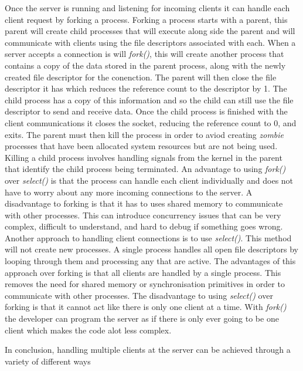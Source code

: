\documentclass[12pt,a4paper,titlepage]{article}
\begin{document}
Once the server is running and listening for incoming clients it can handle each client request by forking a process. Forking a process starts with a parent, this parent will create child processes that will execute along side the parent and will communicate with clients using the file descriptors associated with each. When a server accepts a connection is will \textit{fork()}, this will create another process that contains a copy of the data stored in the parent process, along with the newly created file descriptor for the conenction. The parent will then close the file descriptor it has which reduces the reference count to the descriptor by 1. The child process has a copy of this information and so the child can still use the file descriptor to send and receive data. Once the child process is finished with the client communications it closes the socket, reducing the reference count to 0, and exits. The parent must then kill the process in order to aviod creating \textit{zombie} processes that have been allocated system resources but are not being used. Killing a child process involves handling signals from the kernel in the parent that identify the child process being terminated. An advantage to using \textit{fork()} over \textit{select()} is that the process can handle each client individually and does not have to worry about any more incoming connections to the server. A disadvantage to forking is that it has to uses shared memory to communicate with other processes. This can introduce concurrency issues that can be very complex, difficult to understand, and hard to debug if something goes wrong.\\

Another approach to handling client connections is to use \textit{select()}. This method will not create new processes. A single process handles all open file descriptors by looping through them and processing any that are active. The advantages of this approach over forking is that all clients are handled by a single process. This removes the need for shared memory or synchronisation primitives in order to communicate with other processes.\cite{theworldofselect} The disadvantage to using \textit{select()} over forking is that it cannot act like there is only one client at a time. With \textit{fork()} the developer can program the server as if there is only ever going to be one client which makes the code alot less complex. 



In conclusion, handling multiple clients at the server can be achieved through a variety of different ways 
\end{document}
